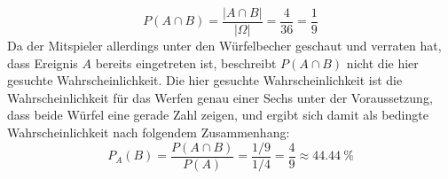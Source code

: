 \begin{exercise}
\begin{equation*}
      P(A\cap B)=\frac{|A\cap B|}{|\Omega|}
      =\frac{4}{36}
      =\frac{1}{9}
    \end{equation*}
    Da der Mitspieler allerdings unter den
    Würfelbecher geschaut und verraten hat,
    dass Ereignis $A$ bereits eingetreten ist,
    beschreibt $P(A\cap B)$ nicht die hier
    gesuchte Wahrscheinlichkeit.
    Die hier gesuchte Wahrscheinlichkeit ist
    die Wahrscheinlichkeit für das Werfen genau
    einer Sechs unter der Voraussetzung, dass
    beide Würfel eine gerade Zahl zeigen, und
    ergibt sich damit als bedingte Wahrscheinlichkeit
    nach folgendem Zusammenhang:
    \begin{equation*}
      P_{A}(B)=\frac{P(A\cap B)}{P(A)}
      =\frac{1/9}{1/4}
      =\frac{4}{9}
      \approx\SI{44.44}{\percent}
    \end{equation*}
  \fi
\end{exercise}
